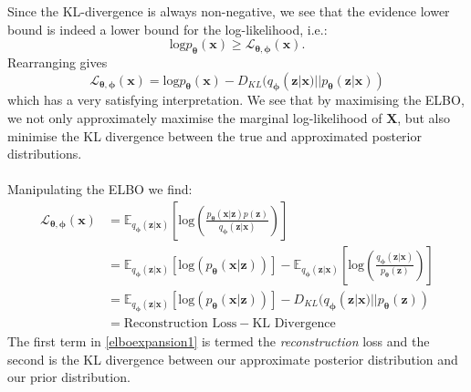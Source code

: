 \documentclass{article}
\theoremstyle{definition}
\begin{document}
Since the KL-divergence is always non-negative, we see that the evidence lower bound is indeed a lower bound for the log-likelihood, i.e.:
$$\text{log}p_{\boldsymbol{\theta}}(\mathbf{x}) \geq \mathcal{L}_{\boldsymbol{\theta}, \boldsymbol{\phi}}(\mathbf{x}).$$
Rearranging gives $$\mathcal{L}_{\boldsymbol{\theta}, \boldsymbol{\phi}}(\mathbf{x})=\text{log}p_{\boldsymbol{\theta}}(\mathbf{x})-D_{KL}(q_{\boldsymbol{\phi}}(\mathbf{z}|\mathbf{x})||p_{\boldsymbol{\theta}}(\mathbf{z}|\mathbf{x}))$$
which has a very satisfying interpretation. We see that by maximising the ELBO, we not only approximately maximise the marginal log-likelihood of $\mathbf{X}$, but also minimise the KL divergence between the true and approximated posterior distributions.\\\\
Manipulating the ELBO we find:
\begin{align}
\mathcal{L}_{\boldsymbol{\theta}, \boldsymbol{\phi}}(\mathbf{x})
&=\mathbb{E}_{q_{\boldsymbol{\phi}}(\mathbf{z}|\mathbf{x})}\left[\text{log}\left(\frac{p_{\boldsymbol{\theta}}(\mathbf{x}| \mathbf{z})p(\mathbf{z})}{q_{\boldsymbol{\phi}}(\mathbf{z}|\mathbf{x})}\right)\right]\\
&=\mathbb{E}_{q_{\boldsymbol{\phi}}(\mathbf{z}|\mathbf{x})}\left[\text{log}\left(p_{\boldsymbol{\theta}}(\mathbf{x}| \mathbf{z})\right)\right]-\mathbb{E}_{q_{\boldsymbol{\phi}}(\mathbf{z}|\mathbf{x})}\left[\text{log}\left(\frac{{q_{\boldsymbol{\phi}}(\mathbf{z}|\mathbf{x})}}{p_{\boldsymbol{\theta}}(\mathbf{z})}\right)\right]\\
\label{elboexpansion1}
&=\mathbb{E}_{q_{\boldsymbol{\phi}}(\mathbf{z}|\mathbf{x})}\left[\text{log}\left(p_{\boldsymbol{\theta}}(\mathbf{x}| \mathbf{z})\right)\right]-D_{KL}(q_{\boldsymbol{\phi}}(\mathbf{z}|\mathbf{x})||p_{\boldsymbol{\theta}}(\mathbf{z}))\\
&=\text{Reconstruction Loss} - \text{KL Divergence}
\end{align}
The first term in \ref{elboexpansion1} is termed the \textit{reconstruction} loss and the second is the KL divergence between our approximate posterior distribution and our prior distribution.
\end{document}
